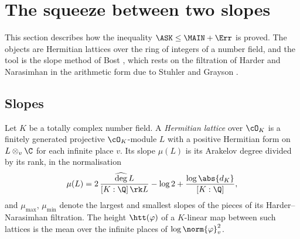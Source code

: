 \section{The squeeze between two slopes}\label{sec:lattices}

This section describes how the inequality $\ASK\le\MAIN+\Err$ is proved. The objects are
Hermitian lattices over the ring of integers of a number field, and the tool is the slope
method of Bost \cite{bost1996,bost2001}, which rests on the filtration of Harder and
Narasimhan \cite{harder1975} in the arithmetic form due to Stuhler and Grayson
\cite{stuhler1976,grayson1984}.

\subsection{Slopes}
Let $K$ be a totally complex number field. A \emph{Hermitian lattice} over $\cO_K$ is a finitely
generated projective $\cO_K$-module $L$ with a positive Hermitian form on $L\otimes_v\C$ for
each infinite place $v$. Its slope $\mu(L)$ is its Arakelov degree divided by its rank, in the
normalisation \lvS
\[
\mu(L)=2\,\frac{\widehat{\deg}\,L}{[K:\Q]\,\rk L}-\log 2+\frac{\log\abs{d_K}}{[K:\Q]},
\]
and $\mu_{\max}$, $\mu_{\min}$ denote the largest and smallest slopes of the pieces of its
Harder--Narasimhan filtration. The height $\htt(\varphi)$ of a $K$-linear map between such
lattices is the mean over the infinite places of $\log\norm{\varphi}_v^2$.

